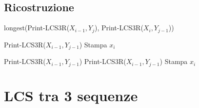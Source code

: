 \subsection{Ricostruzione}
\begin{algorithm}[H]
    \caption{Print-LCS3R}
    \begin{algorithmic}[1]
                \State \Return
            \EndIf

                \State \Return longest(Print-LCS3R($X_{i-1},Y_{j}$), Print-LCS3R($X_{i}, Y_{j-1}$))

                \Else
                        \State Print-LCS3R($X_{i-1},Y_{j-1}$)
                        \State Stampa $x_i$
                    
                        \Else
                                \State Print-LCS3R($X_{i-1},Y_{j-1}$)
                            \Else
                                \State Print-LCS3R($X_{i-1},Y_{j-1}$)
                                \State Stampa $x_i$
                            \EndIf

                    \EndIf
            \EndIf
        \EndProcedure
    \end{algorithmic}
\end{algorithm}


\newpage
\section{LCS tra 3 sequenze}